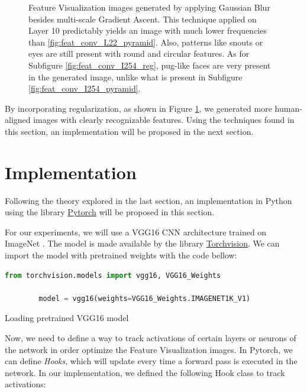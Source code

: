 \begin{figure}
    \caption{
        Feature Visualization images generated by applying Gaussian Blur besides multi-scale Gradient Ascent. 
        This technique applied on Layer 10 predictably yields an image with much lower frequencies than \ref{fig:feat_conv_L22_pyramid}. 
        Also, patterns like snouts or eyes are still present with round and circular features. 
        As for Subfigure \ref{fig:feat_conv_I254_reg}, pug-like faces are very present in the generated image, unlike what is present in Subfigure \ref{fig:feat_conv_I254_pyramid}.   
    }
    \label{fig:feat_vis_regularization}

\end{figure}

\newpage

By incorporating regularization, as shown in Figure \ref{fig:feat_vis_regularization}, we generated more human-aligned images with clearly recognizable features.
Using the techniques found in this section, an implementation will be proposed in the next section.

\section{Implementation}

Following the theory explored in the last section, an implementation in Python using the library \href{https://pytorch.org/}{Pytorch} will be proposed in this section. 

For our experiments, we will use a VGG16 CNN architecture \citep{simonyan2015deepconvolutionalnetworkslargescale} trained on ImageNet \citep{russakovsky2015imagenetlargescalevisual}. The model is made available by the library \href{https://pytorch.org/vision/stable/index.html}{Torchvision}. 
We can import the model with pretrained weights with the code bellow: 

\begin{program}
    \centering

    \begin{lstlisting}[language=Python, style=wider]
        from torchvision.models import vgg16, VGG16_Weights

        model = vgg16(weights=VGG16_Weights.IMAGENET1K_V1)
    \end{lstlisting}

    \caption{Loading pretrained VGG16 model}
\end{program}

Now, we need to define a way to track activations of certain layers or neurons of the network in order optimize the Feature Visualization images. 
In Pytorch, we can define \emph{Hooks}, which will update every time a forward pass is executed in the network. 
In our implementation, we defined the following Hook class to track activations:

